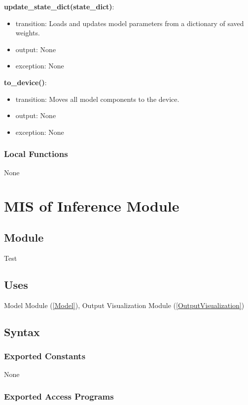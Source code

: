 \documentclass[12pt, titlepage]{article}
\begin{document}
\noindent \textbf{update\_state\_dict(state\_dict)}:
\begin{itemize}
  \item transition: Loads and updates model parameters from a dictionary of saved weights.
  \item output: None
  \item exception: None
\end{itemize}

\noindent \textbf{to\_device()}:
\begin{itemize}
  \item transition: Moves all model components to the device.
  \item output: None
  \item exception: None
\end{itemize}

\subsubsection{Local Functions}
None





\section{MIS of Inference Module} \label{Test}

\subsection{Module}
Test

\subsection{Uses}
Model Module (\ref{Model}), Output Visualization Module (\ref{OutputVisualization})

\subsection{Syntax}

\subsubsection{Exported Constants}
None

\subsubsection{Exported Access Programs}
\end{document}
